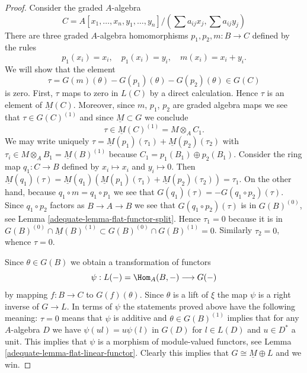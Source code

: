 \begin{proof}
\medskip\noindent
Consider the graded $A$-algebra
$$
C = A[x_1, \ldots, x_n, y_1, \ldots, y_n]/
(\sum a_{ij}x_j, \sum a_{ij}y_j)
$$
There are three graded $A$-algebra homomorphisms $p_1, p_2, m : B \to C$
defined by the rules
$$
p_1(x_i) = x_i, \quad
p_1(x_i) = y_i, \quad
m(x_i) = x_i + y_i.
$$
We will show that the element
$$
\tau = G(m)(\theta) - G(p_1)(\theta) - G(p_2)(\theta) \in G(C)
$$
is zero. First, $\tau$ maps to zero in $L(C)$ by a direct calculation.
Hence $\tau$ is an element of $\underline{M}(C)$.
Moreover, since $m$, $p_1$, $p_2$ are graded algebra maps we see
that $\tau \in G(C)^{(1)}$ and since $\underline{M} \subset G$
we conclude
$$
\tau \in \underline{M}(C)^{(1)} = M \otimes_A C_1.
$$
We may write uniquely
$\tau = \underline{M}(p_1)(\tau_1) + \underline{M}(p_2)(\tau_2)$ with
$\tau_i \in M \otimes_A B_1 = \underline{M}(B)^{(1)}$ because
$C_1 = p_1(B_1) \oplus p_2(B_1)$.
Consider the ring map $q_1 : C \to B$ defined by $x_i \mapsto x_i$ and
$y_i \mapsto 0$. Then
$\underline{M}(q_1)(\tau) =
\underline{M}(q_1)(\underline{M}(p_1)(\tau_1) + \underline{M}(p_2)(\tau_2)) =
\tau_1$.
On the other hand, because
$q_1 \circ m = q_1 \circ p_1$ we see that
$G(q_1)(\tau) = - G(q_1 \circ p_2)(\tau)$. Since $q_1 \circ p_2$ factors as
$B \to A \to B$ we see that $G(q_1 \circ p_2)(\tau)$ is in
$G(B)^{(0)}$, see
Lemma \ref{adequate-lemma-flat-functor-split}.
Hence $\tau_1 = 0$ because it is in
$G(B)^{(0)} \cap \underline{M}(B)^{(1)} \subset
G(B)^{(0)} \cap G(B)^{(1)} = 0$.
Similarly $\tau_2 = 0$, whence $\tau = 0$.

\medskip\noindent
Since $\theta \in G(B)$ we obtain a transformation of functors
$$
\psi : L(-) = \Hom_A(B, - ) \longrightarrow G(-)
$$
by mapping $f : B \to C$ to $G(f)(\theta)$. Since $\theta$ is a lift of
$\xi$ the map $\psi$ is a right inverse of $G \to L$. In terms of
$\psi$ the statements proved above have the following meaning:
$\tau = 0$ means that $\psi$ is additive and
$\theta \in G(B)^{(1)}$ implies that for any $A$-algebra $D$ we have
$\psi(ul) = u\psi(l)$ in $G(D)$ for $l \in L(D)$ and $u \in D^*$ a unit.
This implies that $\psi$ is a morphism of module-valued functors, see
Lemma \ref{adequate-lemma-flat-linear-functor}.
Clearly this implies that $G \cong \underline{M} \oplus L$ and we win.
\end{proof}

